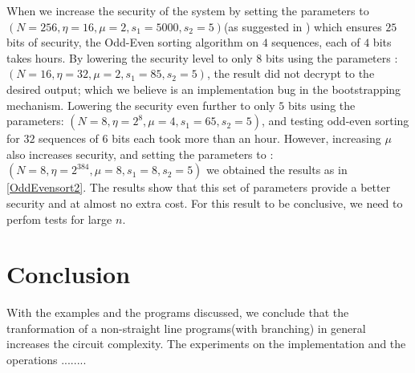 \documentclass{acm_proc_article-sp}
\begin{document}
When we increase the security of the system by setting the parameters to  $(N = 256,\eta  = 16, \mu = 2, s_1 = 5000, s_2 = 5)$(as suggested in \cite{cryptoeprint:2009:571}) which ensures $25$ bits of security, the Odd-Even sorting algorithm on  $4$ sequences, each of $4$ bits takes hours. By lowering the security level to only $8$ bits using the parameters :$(N = 16, \eta = 32, \mu = 2, s_1 = 85, s_2 = 5)$, the result did not decrypt to the desired output; which we believe is an implementation bug in the bootstrapping mechanism. Lowering the security even further to only $5$ bits using the parameters: $(N = 8, \eta = 2^8, \mu = 4, s_1 = 65, s_2 = 5)$, and testing odd-even sorting for $32$ sequences of $6$ bits each took more than an hour. However, increasing $\mu$ also increases security, and setting the parameters to :  $(N = 8, \eta = 2^{384}, \mu = 8, s_1 = 8, s_2 = 5)$ we obtained the results as in \autoref{OddEvensort2}. The results show that this set of parameters provide a better security and at almost no extra cost. For this result to be conclusive, we need to perfom tests for large $n$.
\section{Conclusion}

With the examples and the programs discussed, we conclude that the tranformation of a non-straight line programs(with branching) in general increases the circuit complexity. The experiments on the implementation and the operations ........
\pagebreak


  




%
%
\balancecolumns
\end{document}
